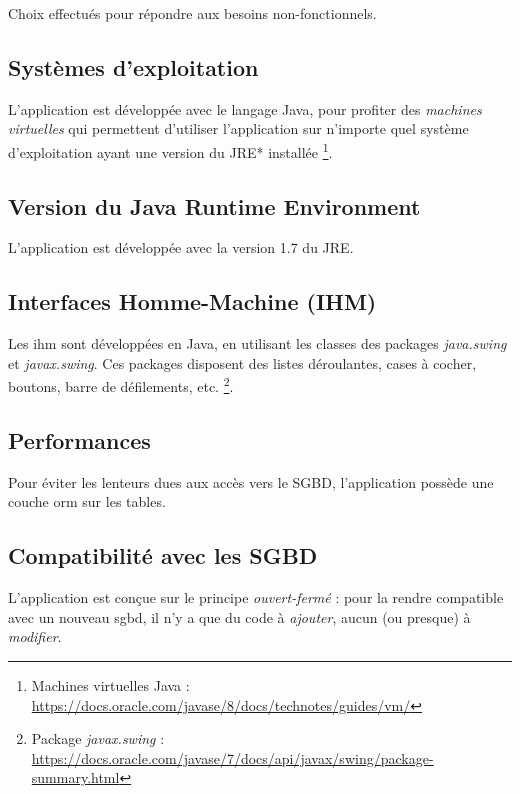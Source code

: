 Choix effectués pour répondre aux besoins non-fonctionnels.

\subsection{Systèmes d'exploitation}
L'application est développée avec le langage Java, pour profiter des \textit{machines virtuelles} qui permettent d'utiliser l'application sur n'importe quel système d'exploitation ayant une version du \gls{JRE}* installée
\footnote{\label{les_machines_virtuelles}Machines virtuelles Java : \url{https://docs.oracle.com/javase/8/docs/technotes/guides/vm/}}.

\subsection{Version du Java Runtime Environment}
L'application est développée avec la version 1.7 du \gls{JRE}.

\subsection{Interfaces Homme-Machine (IHM)}
Les \gls{ihm} sont développées en Java, en utilisant les classes des packages \textit{java.swing} et \textit{javax.swing}.
Ces packages disposent des listes déroulantes, cases à cocher, boutons, barre de défilements, etc.
\footnote{\label{element_de_formulaire}Package \textit{javax.swing} : \url{https://docs.oracle.com/javase/7/docs/api/javax/swing/package-summary.html}}.

\subsection{Performances}
Pour éviter les lenteurs dues aux accès vers le SGBD, l'application possède une couche \gls{orm} sur les tables.

\subsection{Compatibilité avec les SGBD}
L'application est conçue sur le principe \textit{ouvert-fermé} : pour la rendre compatible avec un nouveau \gls{sgbd}, il n'y a que du code à \textit{ajouter}, aucun (ou presque) à \textit{modifier}.
